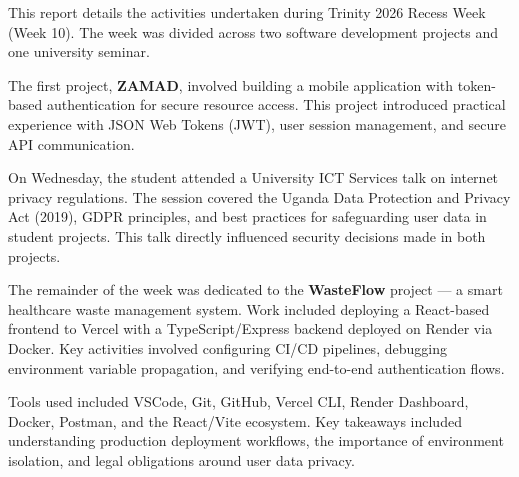 \documentclass[12pt,a4paper]{article}
\begin{document}
This report details the activities undertaken during Trinity 2026 Recess Week (Week 10). The week was divided across two software development projects and one university seminar.

The first project, \textbf{ZAMAD}, involved building a mobile application with token-based authentication for secure resource access. This project introduced practical experience with JSON Web Tokens (JWT), user session management, and secure API communication.

On Wednesday, the student attended a University ICT Services talk on internet privacy regulations. The session covered the Uganda Data Protection and Privacy Act (2019), GDPR principles, and best practices for safeguarding user data in student projects. This talk directly influenced security decisions made in both projects.

The remainder of the week was dedicated to the \textbf{WasteFlow} project --- a smart healthcare waste management system. Work included deploying a React-based frontend to Vercel with a TypeScript/Express backend deployed on Render via Docker. Key activities involved configuring CI/CD pipelines, debugging environment variable propagation, and verifying end-to-end authentication flows.

Tools used included VSCode, Git, GitHub, Vercel CLI, Render Dashboard, Docker, Postman, and the React/Vite ecosystem. Key takeaways included understanding production deployment workflows, the importance of environment isolation, and legal obligations around user data privacy.

\newpage
\tableofcontents

\newpage
\listoffigures

\newpage
\end{document}
